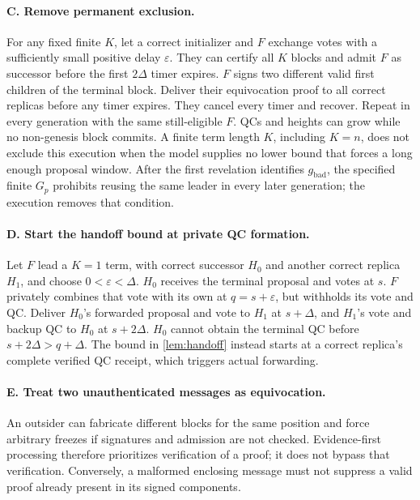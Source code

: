 \documentclass[11pt,a4paper]{article}
\newcommand{\NEW}[1]{{\color{diffNew}#1}}
\newcommand{\NEW}[1]{#1}
\begin{document}
\paragraph{C. Remove permanent exclusion.}
For any fixed finite $K$, let a correct initializer and $F$ exchange votes
with a sufficiently small positive delay $\varepsilon$. They can certify
all $K$ blocks and admit $F$ as successor before the first $2\Delta$
timer expires. $F$ signs two different valid first children of the terminal
block. Deliver their equivocation proof to all correct replicas before
any timer expires. They cancel every timer and recover. Repeat in every
generation with the same still-eligible $F$. QCs and heights can grow
while no non-genesis block commits. A finite \NEW{term length $K$},
including $K=n$, does not exclude this execution when the model supplies
no lower bound that forces a long enough proposal window. After the first
revelation identifies $g_{\mathrm{bad}}$, the specified finite $G_p$
prohibits reusing the same leader in every later generation; the
execution removes that condition.

\paragraph{D. Start the handoff bound at private QC formation.}
Let $F$ lead a $K=1$ term, with correct successor $H_0$ and another correct
replica $H_1$, and choose $0<\varepsilon<\Delta$.
$H_0$ receives the terminal proposal and votes at $s$.
$F$ privately combines that vote with its own at $q=s+\varepsilon$,
but withholds its vote and QC. Deliver $H_0$'s forwarded proposal and vote
to $H_1$ at $s+\Delta$, and $H_1$'s vote and backup QC to $H_0$ at
$s+2\Delta$.
$H_0$ cannot obtain the terminal QC before $s+2\Delta>q+\Delta$.
The bound in \cref{lem:handoff} instead starts at a correct replica's
complete verified QC receipt, which triggers actual forwarding.

\paragraph{E. Treat two unauthenticated messages as equivocation.}
An outsider can fabricate different blocks for the same position and
force arbitrary freezes if signatures and admission are not checked.
Evidence-first processing therefore prioritizes verification of a proof;
it does not bypass that verification. Conversely, a malformed enclosing
message must not suppress a valid proof already present in its signed
components.
\end{document}
